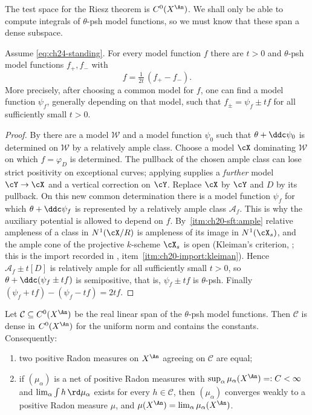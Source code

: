 The test space for the Riesz theorem is $C^0(X^{\An})$.  We shall only be
able to compute integrals of $\theta$-psh model functions, so we must know
that these span a dense subspace.

\begin{lemma}
\label{lem:ch24-psh-difference}
Assume \eqref{eq:ch24-standing}.  For every model function $f$ there are
$t>0$ and $\theta$-psh model functions $f_+,f_-$ with
\[
              f=\tfrac1{2t}\,(f_+-f_-).
\]
More precisely, after choosing a common model for $f$, one can find a
model function $\psi_f$, generally depending on that model, such that
$f_\pm=\psi_f\pm tf$ for all sufficiently small $t>0$.
\end{lemma}

\begin{proof}
By  there are a model
$\mathcal W$ and a model function $\psi_0$ such that
$\theta+\ddc\psi_0$ is determined on $\mathcal W$ by a relatively
ample class.  Choose a model $\cX$ dominating $\mathcal W$ on which
$f=\varphi_D$ is determined.  The pullback of the chosen ample class can
lose strict positivity on exceptional curves; applying
 supplies a \emph{further} model
$\cY\to\cX$ and a vertical correction on $\cY$.  Replace $\cX$ by
$\cY$ and $D$ by its pullback.  On this new common determination there
is a model function $\psi_f$ for which $\theta+\ddc\psi_f$ is
represented by a relatively ample class $\mathcal A_f$.  This is why the
auxiliary potential is allowed to depend on $f$.  By
\,\cref{itm:ch20-sft:ample} relative
ampleness of a class in $N^1(\cX/R)$ is ampleness of its image in
$N^1(\cX_s)$, and the ample cone of the projective $k$-scheme
$\cX_s$ is open (Kleiman's criterion, \cite[\S1.4]{PAG1}; this is the
import recorded in ,
item~\cref{itm:ch20-import:kleiman}).  Hence $\mathcal A_f\pm t[D]$ is
relatively ample for all sufficiently small $t>0$, so
$\theta+\ddc(\psi_f\pm tf)$ is semipositive, that is, $\psi_f\pm tf$ is
$\theta$-psh.  Finally
$(\psi_f+tf)-(\psi_f-tf)=2tf$.
\end{proof}

\begin{lemma}
\label{lem:ch24-dense-tests}
Let $\mathcal C\subseteq C^0(X^{\An})$ be the real linear span of the
$\theta$-psh model functions.  Then $\mathcal C$ is dense in
$C^0(X^{\An})$ for the uniform norm and contains the constants.
Consequently:
\begin{enumerate}
\item\label{itm:ch24-dt:unique} two positive Radon measures on $X^{\An}$
 agreeing on $\mathcal C$ are equal;
\item\label{itm:ch24-dt:conv} if $(\mu_\alpha)$ is a net of positive Radon
 measures with $\sup_\alpha\mu_\alpha(X^{\An})=:C<\infty$ and
 $\lim_\alpha\int h\,\rd\mu_\alpha$ exists for every
 $h\in\mathcal C$, then $(\mu_\alpha)$ converges weakly to a positive
 Radon measure $\mu$, and $\mu(X^{\An})=\lim_\alpha\mu_\alpha(X^{\An})$.
\end{enumerate}
\end{lemma}

